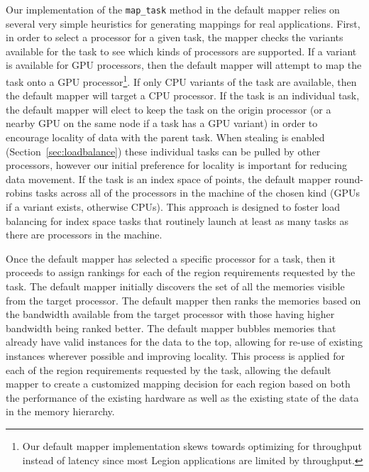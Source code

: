 Our implementation of the {\tt map\_task} method in
the default mapper relies on several very simple heuristics 
for generating mappings for real applications. First, in 
order to  select a processor for a given task, the mapper 
checks the variants available for the task to see which kinds
of processors are supported.  If a variant is available
for GPU processors, then the default mapper will attempt
to map the task onto a GPU processor\footnote{Our default
mapper implementation skews towards optimizing for 
throughput instead of latency since most Legion 
applications are limited by throughput.}. If only
CPU variants of the task are available, then the default
mapper will target a CPU processor. If the task is
an individual task, the default mapper will elect to
keep the task on the origin processor (or a nearby GPU
on the same node if a task has a GPU variant) in order
to encourage locality of data with the parent task. 
When stealing is enabled (Section~\ref{sec:loadbalance})
these individual tasks can be pulled by other processors,
however our initial preference for locality is 
important for reducing data movement.
If the task is an index space of points, the default
mapper round-robins tasks across all of the processors
in the machine of the chosen kind (GPUs if a variant
exists, otherwise CPUs). This approach is designed
to foster load balancing for index space tasks that 
routinely launch at least as many tasks as there are
processors in the machine.

Once the default mapper has selected a specific processor
for a task, then it proceeds to assign rankings for each
of the region requirements requested by the task. The 
default mapper initially discovers the set of all the 
memories visible from the target  processor. The default 
mapper then ranks the memories based on the bandwidth 
available from the target processor with those having 
higher bandwidth being ranked better. The default mapper 
bubbles memories that already have valid instances 
for the data to the top, allowing for re-use of existing 
instances wherever possible and improving locality.
This process is applied for each of the region requirements
requested by the task, allowing the default mapper
to create a customized mapping decision for each region
based on both the performance of the existing hardware
as well as the existing state of the data in the memory
hierarchy.

